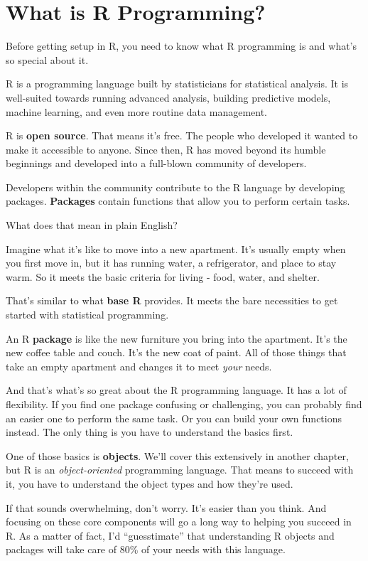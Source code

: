 \documentclass[
]{book}
\begin{document}
\hypertarget{whatisr}{%
\chapter{What is R Programming?}\label{whatisr}}

Before getting setup in R, you need to know what R programming is and what's so special about it.

R is a programming language built by statisticians for statistical analysis. It is well-suited towards running advanced analysis, building predictive models, machine learning, and even more routine data management.

R is \textbf{open source}. That means it's free. The people who developed it wanted to make it accessible to anyone. Since then, R has moved beyond its humble beginnings and developed into a full-blown community of developers.

Developers within the community contribute to the R language by developing packages. \textbf{Packages} contain functions that allow you to perform certain tasks.

What does that mean in plain English?

Imagine what it's like to move into a new apartment. It's usually empty when you first move in, but it has running water, a refrigerator, and place to stay warm. So it meets the basic criteria for living - food, water, and shelter.

That's similar to what \textbf{base R} provides. It meets the bare necessities to get started with statistical programming.

An R \textbf{package} is like the new furniture you bring into the apartment. It's the new coffee table and couch. It's the new coat of paint. All of those things that take an empty apartment and changes it to meet \emph{your} needs.

And that's what's so great about the R programming language. It has a lot of flexibility. If you find one package confusing or challenging, you can probably find an easier one to perform the same task. Or you can build your own functions instead. The only thing is you have to understand the basics first.

One of those basics is \textbf{objects}. We'll cover this extensively in another chapter, but R is an \emph{object-oriented} programming language. That means to succeed with it, you have to understand the object types and how they're used.

If that sounds overwhelming, don't worry. It's easier than you think. And focusing on these core components will go a long way to helping you succeed in R. As a matter of fact, I'd ``guesstimate'' that understanding R objects and packages will take care of 80\% of your needs with this language.
\end{document}
